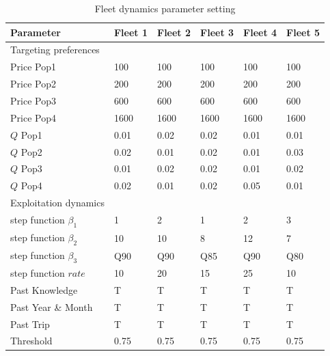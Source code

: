 \documentclass[review]{elsarticle}
\begin{document}
\begin{table}[!ht]
\caption{Fleet dynamics parameter setting}
\begin{tabular}{ p{4cm } p{1cm} p{1cm} p{1cm} p{1cm} p{1cm}}
	\hline
	Parameter & Fleet 1 & Fleet 2 & Fleet 3 & Fleet 4 & Fleet 5 \\
	\hline
	Targeting preferences &&&& \\
	\hline
	Price Pop1 & 100 & 100 & 100 & 100 & 100 \\
	Price Pop2 & 200 & 200 & 200 & 200 & 200 \\
	Price Pop3 & 600 & 600 & 600 & 600 & 600 \\
	Price Pop4 & 1600 & 1600 & 1600 & 1600 & 1600 \\
	$Q$ Pop1 & 0.01 & 0.02 & 0.02 & 0.01 & 0.01 \\
	$Q$ Pop2 & 0.02 & 0.01 & 0.02 & 0.01 & 0.03\\
	$Q$ Pop3 & 0.01 & 0.02 & 0.02 & 0.01 & 0.02 \\
	$Q$ Pop4 & 0.02 & 0.01 & 0.02 & 0.05 & 0.01 \\
	\hline
	Exploitation dynamics &&&& \\
	\hline
	step function $\beta_1$ & 1 & 2 & 1 & 2 & 3 \\
	step function $\beta_2$ & 10 & 10 & 8 & 12 & 7 \\
	step function $\beta_3$ & Q90 & Q90 & Q85 & Q90 & Q80 \\
	step function $rate$ & 10 & 20 & 15 & 25 & 10 \\
	Past Knowledge & T & T & T & T & T \\
	Past Year \& Month & T & T & T & T & T \\
	Past Trip & T & T & T & T & T \\
	Threshold & 0.75 & 0.75 & 0.75 & 0.75 & 0.75 \\
	\hline
\end{tabular}
\label{tab:2}
\end{table}
\end{document}
